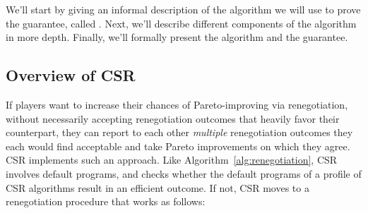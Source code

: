 \documentclass[sigconf]{aamas}
\theoremstyle{definition}
\begin{document}
We’ll start by giving an informal description of the 
algorithm we will use to prove the
guarantee, called
.
Next, we’ll describe different components of the algorithm in more depth.
Finally, we’ll formally present the algorithm
and the guarantee.

\subsection{Overview of 
CSR}
\label{sec:sub:iterated}
If players want to increase
their chances of Pareto-improving
via renegotiation,
without necessarily accepting renegotiation outcomes
that heavily favor their counterpart,
they can report to each other \textit{multiple}
renegotiation
outcomes they each would find acceptable
and take Pareto improvements
on which they agree.
CSR implements such an approach. 
Like Algorithm~\ref{alg:renegotiation},
CSR
involves default programs,
and checks whether the default programs of a profile
of
CSR
algorithms result in an efficient outcome.
If not, CSR moves to a renegotiation procedure that works as follows:
\end{document}
